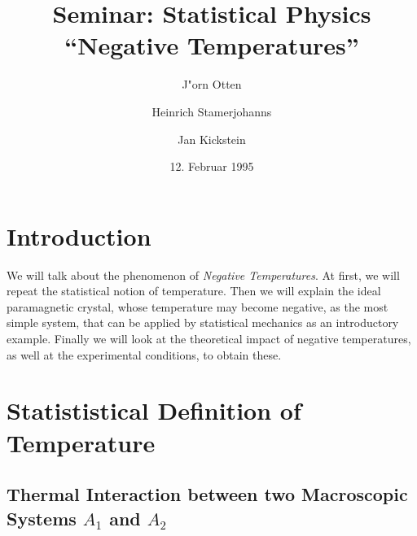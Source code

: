 \documentclass[12pt]{article}
\begin{document}
 \parindent 0pt
\title{Seminar: Statistical Physics\\``Negative Temperatures''}
\author{J"orn Otten\and Heinrich Stamerjohanns\and Jan Kickstein}
\date{12. Februar 1995}
\maketitle
\section{Introduction}
We will talk about the phenomenon of \textsl{Negative Temperatures}.
At first, we will repeat the statistical notion of temperature. Then
we will explain the ideal paramagnetic crystal, whose temperature may
become negative, as the most simple system, that can be applied by statistical
mechanics as an introductory example.
Finally we will look at the theoretical impact of negative temperatures,
as well at the experimental conditions, to obtain these.

\section{Statististical Definition of Temperature}

\subsection{Thermal Interaction between two 
            Macroscopic Systems $A_1$ and $A_2$}
\end{document}
